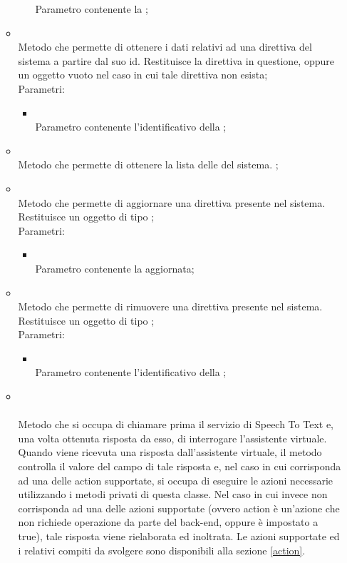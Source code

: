 \begin{itemize}
\begin{itemize}
\begin{itemize}
			Parametro contenente la ;
		\end{itemize}
		\item[]  \\		Metodo che permette di ottenere i dati relativi ad una direttiva del sistema a partire dal suo id. Restituisce la direttiva in questione, oppure un oggetto vuoto nel caso in cui tale direttiva non esista;\\
		Parametri:
		\begin{itemize}
			\item {} \\
			Parametro contenente l'identificativo della ;
		\end{itemize}
		\item[]  \\		Metodo che permette di ottenere la lista delle  del sistema.
;\\
		\item[]  \\		Metodo che permette di aggiornare una direttiva presente nel sistema. Restituisce un oggetto di tipo ;\\
		Parametri:
		\begin{itemize}
			\item {} \\
			Parametro contenente la  aggiornata;
		\end{itemize}
		\item[]  \\		Metodo che permette di rimuovere una direttiva presente nel sistema. Restituisce un oggetto di tipo ;\\
		Parametri:
		\begin{itemize}
			\item {} \\
			Parametro contenente l'identificativo della ;
		\end{itemize}
		\item[]  \\\\		Metodo che si occupa di chiamare prima il servizio di Speech To Text e, una volta ottenuta risposta da esso, di interrogare l'assistente virtuale. Quando viene ricevuta una risposta dall'assistente virtuale, il metodo controlla il valore del campo  di tale risposta e, nel caso in cui corrisponda ad una delle action supportate, si occupa di eseguire le azioni necessarie utilizzando i metodi privati di questa classe. Nel caso in cui invece  non corrisponda ad una delle azioni supportate (ovvero action è un'azione che non richiede operazione da parte del back-end, oppure  è impostato a true), tale risposta viene rielaborata ed inoltrata. Le azioni supportate ed i relativi compiti da svolgere sono disponibili alla sezione \ref{action}. \\

\end{itemize}
\end{itemize}
